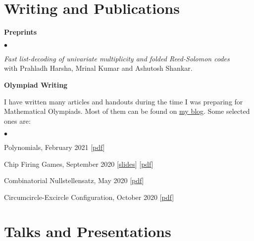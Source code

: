 \documentclass[margin,line, 10pt]{res}
\newenvironment{list2}{
  \begin{list}{$\bullet$}{%
      \setlength{\itemsep}{0in}
      \setlength{\parsep}{0in} \setlength{\parskip}{0in}
      \setlength{\topsep}{0in} \setlength{\partopsep}{0in} 
      \setlength{\leftmargin}{0.2in}}}{\end{list}}
\begin{document}
\begin{resume}
\section{\sc Writing and Publications}


\vspace{-.1cm}

{\bf Preprints}
\begin{list2}
    \item \textit{Fast list-decoding of univariate multiplicity and folded Reed-Solomon codes}\\
     with Prahladh Harsha, Mrinal Kumar and Ashutosh Shankar.
\end{list2}


{\bf Olympiad Writing}

I have written many articles and handouts during the time I was preparing for Mathematical Olympiads. Most of them can be found on \href{https://rgtdfg.blogspot.com/p/handouts.html}{my blog}. Some selected ones are:
\begin{list2}
    \item Polynomials, February 2021 \hfill [\href{https://www.dropbox.com/s/yo31nat6z5ggaue/Polynomials.pdf?dl=0}{pdf}]
    \item Chip Firing Games, September 2020 \hfill [\href{https://www.dropbox.com/s/66a3xw6xad35i8y/chip_firing_presentation.pdf?dl=0}{slides}] [\href{https://www.dropbox.com/s/fu0xmn8u42qdhyl/Chip%20Firing.pdf?dl=0}{pdf}]
    \item Combinatorial Nullstellensatz, May 2020 \hfill [\href{https://www.dropbox.com/s/9vjbqeec17hubov/Combo-Null.pdf?dl=0}{pdf}]
    \item Circumcircle-Excircle Configuration, October 2020 \hfill [\href{https://www.dropbox.com/s/qtxwbpe6tffyyo0/circumex.pdf?dl=0}{pdf}]
\end{list2}


\section{\sc Talks and Presentations}




\end{resume}
\end{document}
